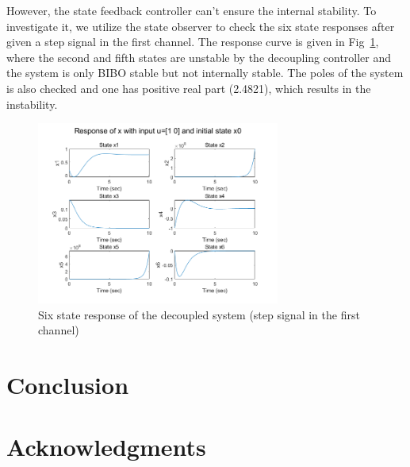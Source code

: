 \documentclass[hyperref]{article}
\theoremstyle{nonumberplain}
\begin{document}
	However, the state feedback controller can't ensure the internal stability. To investigate it, we utilize the state observer to check the six state responses after given a step signal in the first channel. The response curve is given in Fig~\ref{fig23}, where the second and fifth states are unstable by the decoupling controller and the system is only BIBO stable but not internally stable. The poles of the system is also checked and one has positive real part (2.4821), which results in the instability.
	
	 \begin{figure}[H]
	 	\centering
	 	\includegraphics[width=8cm]{fig36.png}
	 	\caption{Six state response of the decoupled system (step signal in the first channel)}
	 	\label{fig23}
	 \end{figure}
	
	
	
	
	\section{Conclusion}
	\section*{Acknowledgments}
	
	
	
	{}
	
\end{document}

